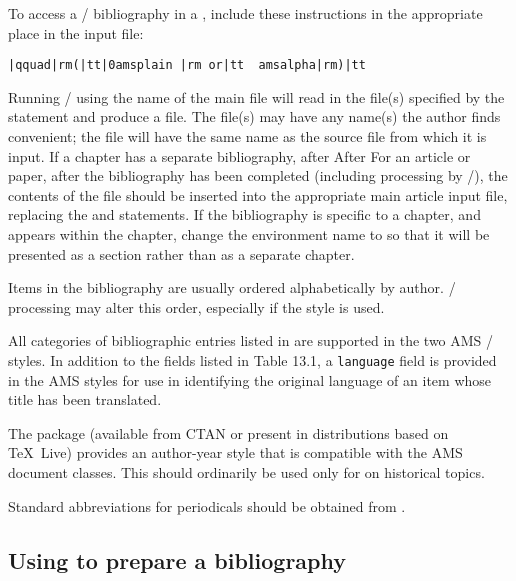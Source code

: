 To access a \bibtex/ bibliography in a , include these
instructions in the appropriate place in the input file:
\begin{verbatim}
|qquad|rm(|tt|0amsplain |rm or|tt  amsalpha|rm)|tt

\end{verbatim}

Running \bibtex/ using the name of the main file will read in the
 file(s) specified by the  statement and
produce a  file.  The  file(s) may have any name(s)
the author finds convenient; the  file will have the same name
as the source file from which it is input.
\ifmonograph
 If a chapter has a separate bibliography, after
\else \ifmemoirs After
\else %
 For an article or paper, after
\fi \fi
the bibliography has been completed (including processing by \bibtex/),
the contents of the  file should be inserted into the
\ifmonograph appropriate 
\else \ifmemoirs
\else main article
\fi \fi
input file, replacing the  and 
statements.
\ifmonograph
 If the bibliography is specific to a chapter, and appears
 within the chapter, change the environment name 
 to  so that it will be presented as a
 section rather than as a separate chapter.
\fi

Items in the bibliography are usually ordered alphabetically by author.
\bibtex/ processing may alter this order, especially if the
 style is used.

All categories of bibliographic entries listed in
\cite[Table 13.1]{MG} are supported in the two AMS \bibtex/ styles.
In addition to the fields listed in Table 13.1, a \verb+language+ field
is provided in the AMS styles for use in identifying the original
language of an item whose title has been translated.

The  package (available from CTAN or present in
distributions based on \TeX\ Live) provides an
author-year style that is compatible with the AMS document classes.
This should ordinarily be used only for
 on historical topics.

Standard abbreviations for periodicals should be obtained from
\cite{ABMR}\@.

\subsection{Using  to prepare a bibliography}


